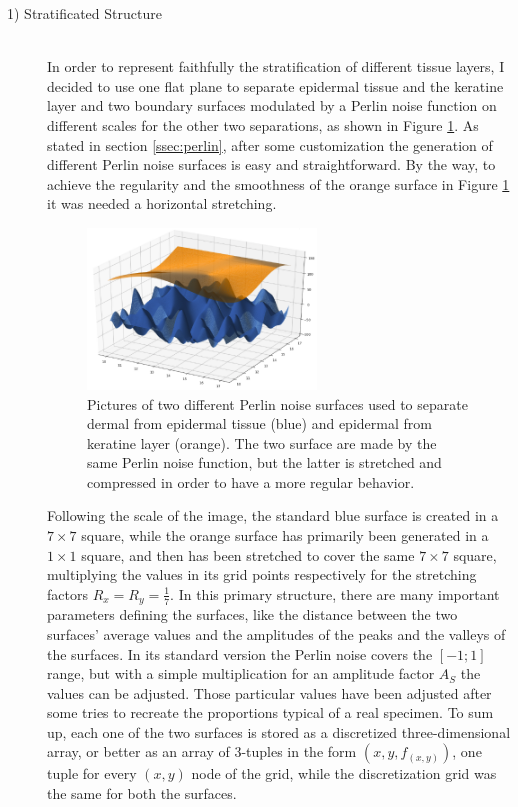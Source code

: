     \begin{description}
        \item [1) Stratificated Structure] \hfill \\
        In order to represent faithfully the stratification of different tissue layers, I decided to use one flat plane to separate epidermal tissue and the keratine layer and two boundary surfaces modulated by a Perlin noise function on different scales for the other two separations, as shown in Figure \ref{fig:2_surf_plot}. As stated in section \ref{ssec:perlin}, after some customization the generation of different Perlin noise surfaces is easy and straightforward. By the way, to achieve the regularity and the smoothness of the orange surface in Figure \ref{fig:2_surf_plot} it was needed a horizontal stretching.

        \begin{figure}
            \centering
            \includegraphics[width = 0.6\textwidth]{images/2_surf_plot}
            \caption{Pictures of two different Perlin noise surfaces used to separate dermal from epidermal tissue (blue) and epidermal from keratine layer (orange). The two surface are made by the same Perlin noise function, but the latter is stretched and compressed in order to have a more regular behavior.}
            \label{fig:2_surf_plot}
        \end{figure}

        Following the scale of the image, the standard blue surface is created in a $7 \times 7$ square, while the orange surface has primarily been generated in a $1 \times 1$ square, and then has been stretched to cover the same $7 \times 7$ square, multiplying the values in its grid points respectively for the stretching factors $R_x=R_y=\frac{1}{7}$. In this primary structure, there are many important parameters defining the surfaces, like the distance between the two surfaces' average values and the amplitudes of the peaks and the valleys of the surfaces. In its standard version the Perlin noise covers the $[-1;1]$ range, but with a simple multiplication for an amplitude factor $A_S$ the values can be adjusted. Those particular values have been adjusted after some tries to recreate the proportions typical of a real specimen. To sum up, each one of the two surfaces is stored as a discretized three-dimensional array, or better as an array of 3-tuples in the form $(x,y,f_{(x,y)})$, one tuple for every $(x,y)$ node of the grid, while the discretization grid was the same for both the surfaces.


\end{description}

